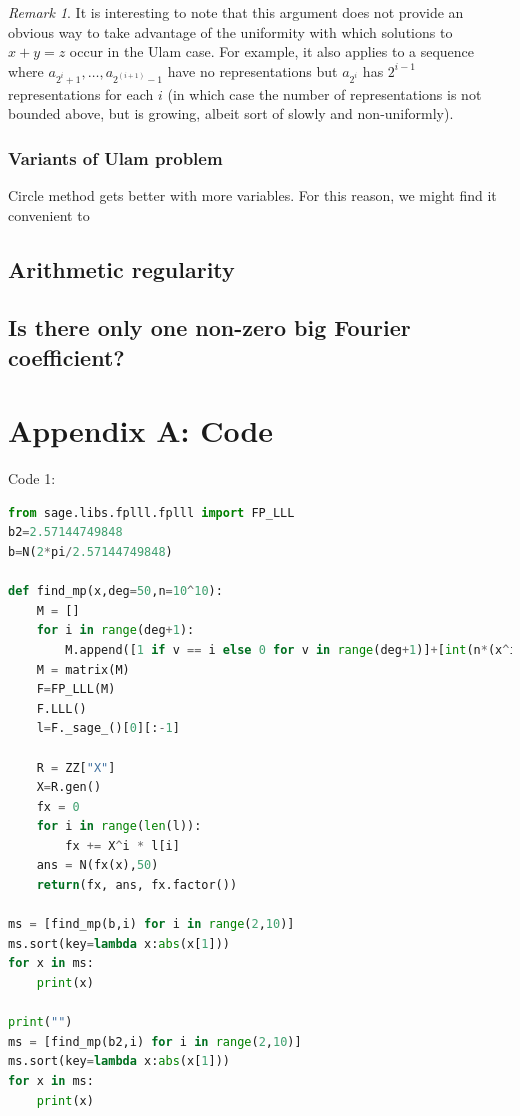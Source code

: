 \documentclass{article}
\theoremstyle{definition}
\theoremstyle{remark}
\newtheorem{remark}{Remark}
\numberwithin{equation}{section}
\begin{document}
{\begin{remark}
  It is interesting to note that this argument does not provide an
  obvious way to take advantage of the uniformity with which solutions
  to $x+y=z$ occur in the Ulam case.  For example, it also applies to
  a sequence where $a_{2^i+1}, \ldots, a_{2^(i+1)-1}$ have no
  representations but $a_{2^i}$ has $2^{i-1}$ representations for each
  $i$ (in which case the number of representations is not bounded
  above, but is growing, albeit sort of slowly and non-uniformly).
\end{remark}

\subsubsection{Variants of Ulam problem}

Circle method gets better with more variables.  For this reason, we
might find it convenient to 

\subsection{Arithmetic regularity}


\subsection{Is there only one non-zero big Fourier coefficient?}

\section{Appendix A: Code}

Code 1: 

\begin{lstlisting}[language=Python]% {../lll.py}
from sage.libs.fplll.fplll import FP_LLL
b2=2.57144749848
b=N(2*pi/2.57144749848)

def find_mp(x,deg=50,n=10^10):
    M = []
    for i in range(deg+1):
        M.append([1 if v == i else 0 for v in range(deg+1)]+[int(n*(x^i)+.5)])
    M = matrix(M)
    F=FP_LLL(M)
    F.LLL()
    l=F._sage_()[0][:-1]

    R = ZZ["X"]
    X=R.gen()
    fx = 0
    for i in range(len(l)):
        fx += X^i * l[i]
    ans = N(fx(x),50)
    return(fx, ans, fx.factor())

ms = [find_mp(b,i) for i in range(2,10)]
ms.sort(key=lambda x:abs(x[1]))
for x in ms:
    print(x)

print("")
ms = [find_mp(b2,i) for i in range(2,10)]
ms.sort(key=lambda x:abs(x[1]))
for x in ms:
    print(x)
\end{lstlisting}

}
\end{document}
